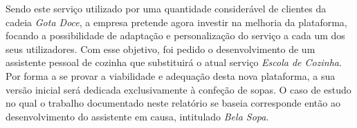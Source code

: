 Sendo este serviço utilizado por uma quantidade considerável de clientes da cadeia \emph{Gota Doce}, a empresa pretende agora investir na melhoria da plataforma, focando a possibilidade de adaptação e personalização do serviço a cada um dos seus utilizadores. Com esse objetivo, foi pedido o desenvolvimento de um assistente pessoal de cozinha que substituirá o atual serviço \emph{Escola de Cozinha}. Por forma a se provar a viabilidade e adequação desta nova plataforma, a sua versão inicial será dedicada exclusivamente à confeção de sopas. O caso de estudo no qual o trabalho documentado neste relatório se baseia corresponde então ao desenvolvimento do assistente em causa, intitulado \emph{Bela Sopa}.









